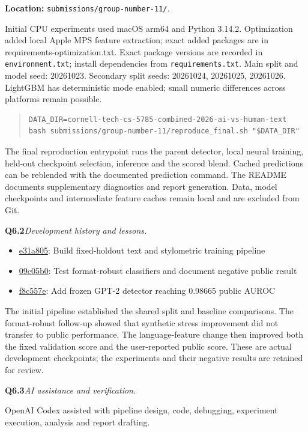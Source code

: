 \documentclass[10pt,letterpaper]{article}
\newcommand{\q}[2]{\needspace{4\baselineskip}\par\addvspace{7pt}\textbf{#1}\quad\textit{#2}\par\nobreak}
\begin{document}
\textbf{Location:} \texttt{submissions/group-number-11/}.\par
Initial CPU experiments used macOS arm64 and Python 3.14.2. Optimization added local Apple MPS feature extraction; exact added packages are in requirements-optimization.txt. Exact package versions are recorded in \texttt{environment.txt}; install dependencies from \texttt{requirements.txt}. Main split and model seed: 20261023. Secondary split seeds: 20261024, 20261025, 20261026. LightGBM has deterministic mode enabled; small numeric differences across platforms remain possible.
\begin{quote}\footnotesize\begin{verbatim}
DATA_DIR=cornell-tech-cs-5785-combined-2026-ai-vs-human-text
bash submissions/group-number-11/reproduce_final.sh "$DATA_DIR"
\end{verbatim}\end{quote}
The final reproduction entrypoint runs the parent detector, local neural training, held-out checkpoint selection, inference and the scored blend. Cached predictions can be reblended with the documented prediction command. The README documents supplementary diagnostics and report generation. Data, model checkpoints and intermediate feature caches remain local and are excluded from Git.
\q{Q6.2}{Development history and lessons.}\begin{itemize}[leftmargin=1.5em,itemsep=3pt]
\item \href{https://github.com/Gracee-Gu/human-or-ai-submissions/commit/e31a805}{e31a805}: Build fixed-holdout text and stylometric training pipeline
\item \href{https://github.com/Gracee-Gu/human-or-ai-submissions/commit/09c05b0}{09c05b0}: Test format-robust classifiers and document negative public result
\item \href{https://github.com/Gracee-Gu/human-or-ai-submissions/commit/f8c557e}{f8c557e}: Add frozen GPT-2 detector reaching 0.98665 public AUROC
\end{itemize}The initial pipeline established the shared split and baseline comparisons. The format-robust follow-up showed that synthetic stress improvement did not transfer to public performance. The language-feature change then improved both the fixed validation score and the user-reported public score. These are actual development checkpoints; the experiments and their negative results are retained for review.
\q{Q6.3}{AI assistance and verification.}
OpenAI Codex assisted with pipeline design, code, debugging, experiment execution, analysis and report drafting.
\end{document}
